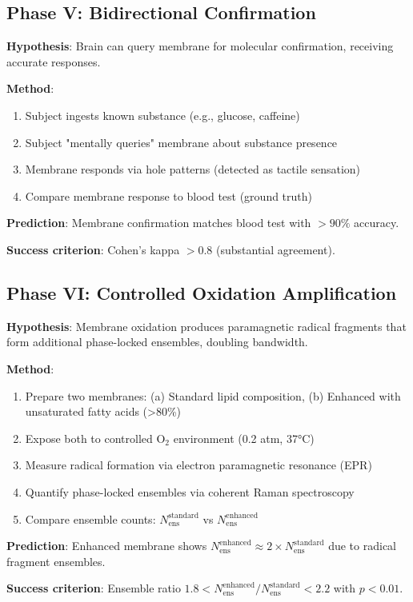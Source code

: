 \documentclass[11pt,a4paper]{article}
\theoremstyle{definition}
\theoremstyle{remark}
\begin{document}
\subsection{Phase V: Bidirectional Confirmation}

\begin{experiment}
\textbf{Hypothesis}: Brain can query membrane for molecular confirmation, receiving accurate responses.

\textbf{Method}:
\begin{enumerate}
\item Subject ingests known substance (e.g., glucose, caffeine)
\item Subject "mentally queries" membrane about substance presence
\item Membrane responds via hole patterns (detected as tactile sensation)
\item Compare membrane response to blood test (ground truth)
\end{enumerate}

\textbf{Prediction}: Membrane confirmation matches blood test with $>90\%$ accuracy.

\textbf{Success criterion}: Cohen's kappa $>0.8$ (substantial agreement).
\end{experiment}

\subsection{Phase VI: Controlled Oxidation Amplification}

\begin{experiment}
\textbf{Hypothesis}: Membrane oxidation produces paramagnetic radical fragments that form additional phase-locked ensembles, doubling bandwidth.

\textbf{Method}:
\begin{enumerate}
\item Prepare two membranes: (a) Standard lipid composition, (b) Enhanced with unsaturated fatty acids (>80\%)
\item Expose both to controlled O$_2$ environment (0.2 atm, 37°C)
\item Measure radical formation via electron paramagnetic resonance (EPR)
\item Quantify phase-locked ensembles via coherent Raman spectroscopy
\item Compare ensemble counts: $N_{\text{ens}}^{\text{standard}}$ vs $N_{\text{ens}}^{\text{enhanced}}$
\end{enumerate}

\textbf{Prediction}: Enhanced membrane shows $N_{\text{ens}}^{\text{enhanced}} \approx 2 \times N_{\text{ens}}^{\text{standard}}$ due to radical fragment ensembles.

\textbf{Success criterion}: Ensemble ratio $1.8 < N_{\text{ens}}^{\text{enhanced}}/N_{\text{ens}}^{\text{standard}} < 2.2$ with $p < 0.01$.
\end{experiment}
\end{document}

